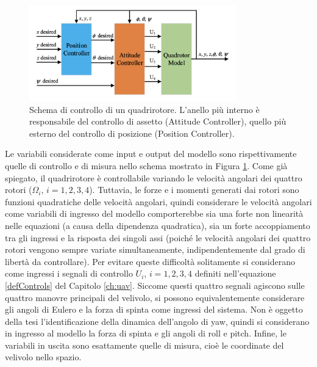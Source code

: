 \begin{figure}[H]
	\centering
	\includegraphics[width=0.8\textwidth]{gfx/quadControlSystem}
	\caption[Schema di controllo di un quadrirotore.]{Schema di controllo di un quadrirotore. L'anello più interno è responsabile del controllo di assetto (Attitude Controller), quello più esterno del controllo di posizione (Position Controller).}
	\label{fig:quadControlSystem}
\end{figure}

Le variabili considerate come input e output del modello sono rispettivamente quelle di controllo e di misura nello schema mostrato in Figura \ref{fig:quadControlSystem}. Come già spiegato, il quadrirotore è controllabile variando le velocità angolari dei quattro rotori ($\Omega_i$, $i = 1,2,3,4$). Tuttavia, le forze e i momenti generati dai rotori sono funzioni quadratiche delle velocità angolari, quindi considerare le velocità angolari come variabili di ingresso del modello comporterebbe sia una forte non linearità nelle equazioni (a causa della dipendenza quadratica), sia un forte accoppiamento tra gli ingressi e la risposta dei singoli assi (poiché le velocità angolari dei quattro rotori vengono sempre variate simultaneamente, indipendentemente dal grado di libertà da controllare). Per evitare queste difficoltà solitamente si considerano come ingressi i segnali di controllo $U_i$, $i = 1,2,3,4$ definiti nell'equazione \ref{defControls} del Capitolo \ref{ch:uav}. Siccome questi quattro segnali agiscono sulle quattro manovre principali del velivolo, si possono equivalentemente considerare gli angoli di Eulero e la forza di spinta come ingressi del sistema. Non è oggetto della tesi l'identificazione della dinamica dell'angolo di yaw, quindi si considerano in ingresso al modello la forza di spinta e gli angoli di roll e pitch. Infine, le variabili in uscita sono esattamente quelle di misura, cioè le coordinate del velivolo nello spazio.\\

